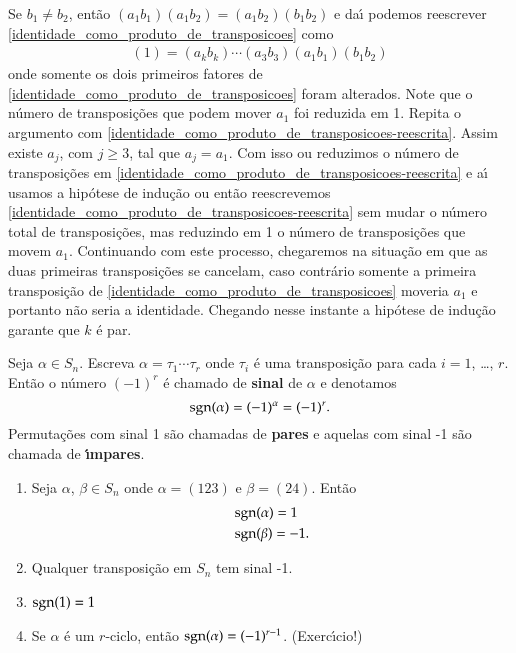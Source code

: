 \begin{prova}
	Se $b_1 \ne b_2$, ent\~ao $(a_1 b_1)(a_1 b_2) = (a_1 b_2)(b_1 b_2)$ e da{\'\i} podemos reescrever \eqref{identidade_como_produto_de_transposicoes} como
	\begin{align}\label{identidade_como_produto_de_transposicoes-reescrita}
		(1) = (a_k b_k)\cdots (a_3 b_3)(a_1 b_1)(b_1 b_2)
	\end{align}
	onde somente os dois primeiros fatores de \eqref{identidade_como_produto_de_transposicoes} foram alterados. Note que o n\'umero de transposi\c{c}\~oes que podem mover $a_1$ foi reduzida em 1. Repita o argumento com \eqref{identidade_como_produto_de_transposicoes-reescrita}. Assim existe $a_j$, com $j \ge 3$, tal que $a_j = a_1$. Com isso ou reduzimos o n\'umero de transposi\c{c}\~oes em \eqref{identidade_como_produto_de_transposicoes-reescrita} e a{\'\i} usamos a hip\'otese de indu\c{c}\~ao ou ent\~ao reescrevemos \eqref{identidade_como_produto_de_transposicoes-reescrita} sem mudar o n\'umero total de transposi\c{c}\~oes, mas reduzindo em 1 o n\'umero de transposi\c{c}\~oes que movem $a_1$. Continuando com este processo, chegaremos na situa\c{c}\~ao em que as duas primeiras transposi\c{c}\~oes se cancelam, caso contr\'ario somente a primeira transposi\c{c}\~ao de \eqref{identidade_como_produto_de_transposicoes} moveria $a_1$ e portanto n\~ao seria a identidade. Chegando nesse instante a hip\'otese de indu\c{c}\~ao garante que $k$ \'e par.
\end{prova}

\begin{definicao}
	Seja $\alpha \in S_n$. Escreva $\alpha = \tau_1 \cdots\tau_r$ onde $\tau_i$ \'e uma transposi\c{c}\~ao para cada $i = 1$, \dots, $r$. Ent\~ao o n\'umero $(-1)^r$ \'e chamado de \textbf{sinal} de $\alpha$ e denotamos
	\begin{equation}
		{\rm sgn}(\alpha) = (-1)^\alpha = (-1)^r.
	\end{equation}
	Permuta\c{c}\~oes com sinal 1 s\~ao chamadas de \textbf{pares} e aquelas com sinal -1 s\~ao chamada de \textbf{{\'\i}mpares}.
\end{definicao}

\begin{exemplos}
	\begin{enumerate}[label=({\arabic*})]
		\item Seja $\alpha$, $\beta \in S_n$ onde $\alpha = (123)$ e $\beta = (24)$. Ent\~ao
		\begin{align*}
			&{\rm sgn}(\alpha) = 1\\
			&{\rm sgn}(\beta) = -1.
		\end{align*}

		\item Qualquer transposi\c{c}\~ao em $S_n$ tem sinal -1.

		\item ${\rm sgn}(1) = 1$

		\item Se $\alpha$ \'e um $r$-ciclo, ent\~ao ${\rm sgn}(\alpha) = (-1)^{r - 1}$. (Exerc{\'\i}cio!)
	\end{enumerate}
\end{exemplos}


